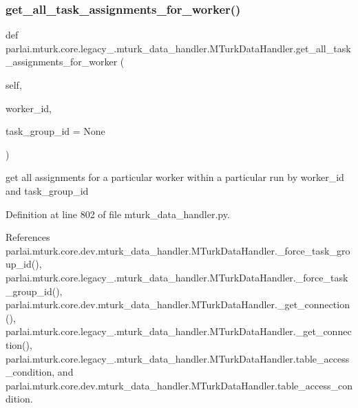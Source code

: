 \subsubsection{\texorpdfstring{get\+\_\+all\+\_\+task\+\_\+assignments\+\_\+for\+\_\+worker()}{get\_all\_task\_assignments\_for\_worker()}}
{\footnotesize\ttfamily def parlai.\+mturk.\+core.\+legacy\+\_.\+mturk\+\_\+data\+\_\+handler.\+M\+Turk\+Data\+Handler.\+get\+\_\+all\+\_\+task\+\_\+assignments\+\_\+for\+\_\+worker (\begin{DoxyParamCaption}\item[{}]{self,  }\item[{}]{worker\+\_\+id,  }\item[{}]{task\+\_\+group\+\_\+id = {\ttfamily None} }\end{DoxyParamCaption})}

\begin{DoxyVerb}get all assignments for a particular worker within a
particular run by worker_id and task_group_id
\end{DoxyVerb}
 

Definition at line 802 of file mturk\+\_\+data\+\_\+handler.\+py.



References parlai.\+mturk.\+core.\+dev.\+mturk\+\_\+data\+\_\+handler.\+M\+Turk\+Data\+Handler.\+\_\+force\+\_\+task\+\_\+group\+\_\+id(), parlai.\+mturk.\+core.\+legacy\+\_.\+mturk\+\_\+data\+\_\+handler.\+M\+Turk\+Data\+Handler.\+\_\+force\+\_\+task\+\_\+group\+\_\+id(), parlai.\+mturk.\+core.\+dev.\+mturk\+\_\+data\+\_\+handler.\+M\+Turk\+Data\+Handler.\+\_\+get\+\_\+connection(), parlai.\+mturk.\+core.\+legacy\+\_.\+mturk\+\_\+data\+\_\+handler.\+M\+Turk\+Data\+Handler.\+\_\+get\+\_\+connection(), parlai.\+mturk.\+core.\+legacy\+\_.\+mturk\+\_\+data\+\_\+handler.\+M\+Turk\+Data\+Handler.\+table\+\_\+access\+\_\+condition, and parlai.\+mturk.\+core.\+dev.\+mturk\+\_\+data\+\_\+handler.\+M\+Turk\+Data\+Handler.\+table\+\_\+access\+\_\+condition.

